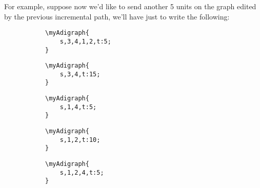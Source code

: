 \documentclass{report}
\begin{document}
For example, suppose now we'd like to send another 5 units on the graph edited by the previous incremental path, we'll have just to write the following:

\begin{figure}
	\begin{subfigure}{0.49\textwidth}
		\begin{verbatim}
\myAdigraph{
	s,3,4,1,2,t:5;
}
\end{verbatim}
	\end{subfigure}
	\begin{subfigure}{0.49\textwidth}
	\end{subfigure}
\end{figure}

\begin{figure}
	\begin{subfigure}{0.49\textwidth}
		\begin{verbatim}
\myAdigraph{
	s,3,4,t:15;
}
\end{verbatim}
	\end{subfigure}
	\begin{subfigure}{0.49\textwidth}
	\end{subfigure}
\end{figure}

\begin{figure}
	\begin{subfigure}{0.49\textwidth}
		\begin{verbatim}
\myAdigraph{
	s,1,4,t:5;
}
\end{verbatim}
	\end{subfigure}
	\begin{subfigure}{0.49\textwidth}
	\end{subfigure}
\end{figure}

\begin{figure}
	\begin{subfigure}{0.49\textwidth}
		\begin{verbatim}
\myAdigraph{
	s,1,2,t:10;
}
\end{verbatim}
	\end{subfigure}
	\begin{subfigure}{0.49\textwidth}
	\end{subfigure}
\end{figure}

\begin{figure}
	\begin{subfigure}{0.49\textwidth}
		\begin{verbatim}
\myAdigraph{
	s,1,2,4,t:5;
}
\end{verbatim}
	\end{subfigure}
	\begin{subfigure}{0.49\textwidth}
	\end{subfigure}
\end{figure}
\end{document}
